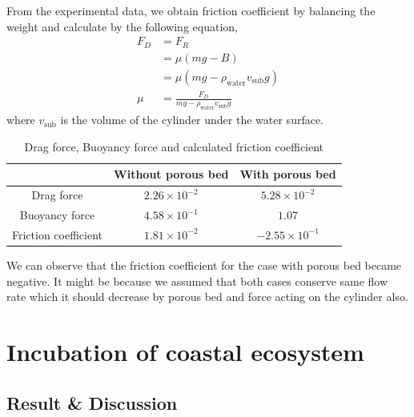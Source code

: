 \documentclass[a4paper]{report}
\begin{document}
From the experimental data, we obtain friction coefficient by balancing the weight and calculate by the following equation,
\begin{align*}
    F_D &= F_R \\
    &= \mu(mg-B)\\
    &=\mu(mg-\rho_{\text{water}}v_{\text{sub}}g)\\
    \mu &=\frac{F_D}{mg-\rho_{\text{water}}v_{\text{sub}}g}
\end{align*}
where $v_{\text{sub}}$ is the volume of the cylinder under the water surface.

\begin{table}[H]
    \centering
    \begin{tabular}{|c|c|c|}\hline
        & Without porous bed & With porous bed \\\hline
        Drag force & $2.26\times10^{-2}$ & $5.28\times10^{-2}$ \\\hline
        Buoyancy force & $4.58\times10^{-1}$ & $1.07$ \\\hline
        Friction coefficient & $1.81\times10^{-2}$ & $-2.55\times10^{-1}$\\\hline
    \end{tabular}
    \caption{Drag force, Buoyancy force and calculated friction coefficient}
    \label{tb:drag-b-mu}
\end{table}

We can observe that the friction coefficient for the case with porous bed became negative. It might be because we assumed that both cases conserve same flow rate which it should decrease by porous bed and force acting on the cylinder also.


\chapter{Incubation of coastal ecosystem}
\label{sec:secondExperiment}

\section{Result \& Discussion}
\end{document}
